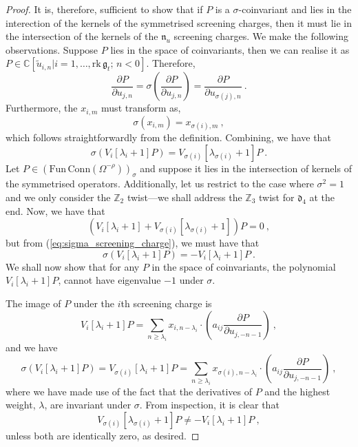 \documentclass[a4paper]{article}
\def\IC{\mathbb{C}}
\def\IZ{\mathbb{Z}}
\def\df{\mathfrak{d}}
\def\gf{\mathfrak{g}}
\begin{document}
\begin{proof}
It is, therefore, sufficient to show that if $P$ is a $\sigma$-coinvariant and lies in the interection of the kernels of the symmetrised screening charges, then it must lie in the intersection of the kernels of the $\mathfrak{n}_u$ screening charges.
We make the following observations. Suppose $P$ lies in the space of coinvariants, then we can realise it as $P\in\IC[\tilde{u}_{i,n}|i=1,\dots,\mathrm{rk}\,\gf_t;\,n<0]$. Therefore,
\begin{equation}
	\frac{\partial P}{\partial u_{j,n}} = \sigma \left( \frac{\partial P}{\partial u_{j,n}}\right) = \frac{\partial P}{\partial u_{\sigma(j),n}} ~.
\end{equation}
Furthermore, the $x_{i,m}$ must transform as,
\begin{equation}
	\sigma(x_{i,m}) = x_{\sigma(i),m}~,
\end{equation}
which follows straightforwardly from the definition. Combining, we have that
\begin{equation}\label{eq:sigma_screening_charge}
	\sigma\left(V_i[\lambda_i + 1] P\right) = V_{\sigma(i)}[\lambda_{\sigma(i)}+1]P~.
\end{equation}
Let $P\in(\mathrm{Fun\, Conn}(\Omega^{-\rho}))_\sigma$ and suppose it lies in the intersection of kernels of the symmetrised operators. Additionally, let us restrict to the case where $\sigma^2=1$ and we only consider the $\IZ_2$ twist---we shall address the $\IZ_3$ twist for $\df_4$ at the end. Now, we have that
\begin{equation}
	(V_{i}[\lambda_i+1] + V_{\sigma(i)}[\lambda_{\sigma(i)}+1])P = 0~,
\end{equation}
but from (\ref{eq:sigma_screening_charge}), we must have that
\begin{equation}
	\sigma\left(V_{i}[\lambda_i+1]P\right)=-V_{i}[\lambda_i+1]P~.
\end{equation}
We shall now show that for any $P$ in the space of coinvariants, the polynomial $V_i[\lambda_i+1]P$, cannot have eigenvalue $-1$ under $\sigma$.

The image of $P$ under the $i$th screening charge is
\begin{equation}
	V_i[\lambda_i +1]P = \sum_{n\ge\lambda_i} x_{i,n-\lambda_i}\cdot \left( a_{ij} \frac{\partial P}{\partial u_{j,-n-1}} \right)~,
\end{equation}
and we have
\begin{equation}
	\sigma \left( V_i[\lambda_i +1]P \right) = V_{\sigma(i)}[\lambda_{i}+1]P= \sum_{n\ge\lambda_{i}} x_{\sigma(i),n-\lambda_{i}}\cdot \left( a_{ij} \frac{\partial P}{\partial u_{j,-n-1}} \right)~,
\end{equation}
where we have made use of the fact that the derivatives of $P$ and the highest weight, $\lambda$, are invariant under $\sigma$. From inspection, it is clear that
\begin{equation}
	V_{\sigma(i)}[\lambda_{\sigma(i)}+1]P\neq- V_i[\lambda_i +1]P ~,
\end{equation}
unless both are identically zero, as desired.


\end{proof}
\end{document}
